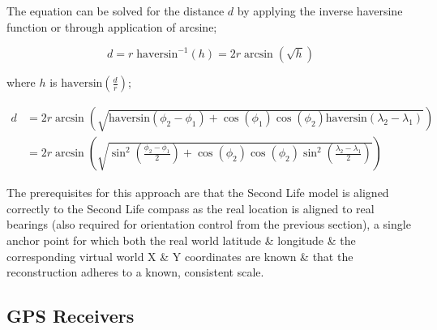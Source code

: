 The equation can be solved for the distance $d$ by applying the inverse haversine function or through application of arcsine;

\begin{equation}
	\label{haversine3}
	d = r\;\text{haversin}^{-1}\left( h \right) = 2r \arcsin \left( \sqrt{h} \right)
\end{equation}

where $h$ is $\text{haversin}\left( \frac{d}{r} \right)$;

\begin{align}
d & = 2r \arcsin\left( \sqrt{\text{haversin} \left( \phi_{2} - \phi_{1} \right) + \cos \left( \phi_{1} \right) \cos  \left( \phi_{2} \right) \text{haversin} \left( \lambda_{2} - \lambda_{1} \right) } \right) \nonumber \\ 
& = 2r \arcsin\left( \sqrt{\sin^{2} \left( \frac{\phi_{2} - \phi_{1}}{2}\right) + \cos\left( \phi_{2} \right) \cos\left( \phi_{2} \right) \sin^{2} \left( \frac{\lambda_{2} - \lambda_{1}}{2} \right) } \right)
\end{align}

The prerequisites for this approach are that the Second Life model is aligned correctly to the Second Life compass as the real location is aligned to real bearings (also required for orientation control from the previous section), a single anchor point for which both the real world latitude \& longitude \& the corresponding virtual world X \& Y coordinates are known \& that the reconstruction adheres to a known, consistent scale.


\subsection{GPS Receivers}

\newcommand{\azurewaveFootnote}{\footnote{\url{http://www.azurewave.com/product_GPS-M19_1.asp}}}

\newcommand{\habFootnote}{\footnote{\url{http://ukhas.org.uk/}}}

\newcommand{\ubloxFootnote}{\footnote{\url{https://u-blox.com/en/gps-modules/pvt-modules/previous-generations/max-6.html}}}

\newcommand{\sarantelFootnote}{\footnote{\url{http://www.sarantel.com/sl1200_(33).html}}}


